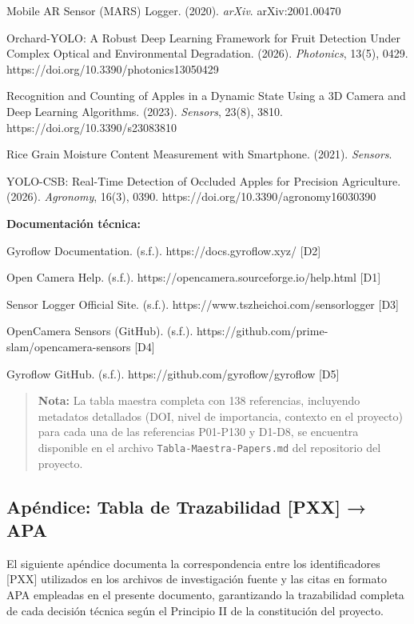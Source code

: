 Mobile AR Sensor (MARS) Logger. (2020). \textit{arXiv}. arXiv:2001.00470


Orchard-YOLO: A Robust Deep Learning Framework for Fruit Detection Under Complex Optical and Environmental Degradation. (2026). \textit{Photonics}, 13(5), 0429. https://doi.org/10.3390/photonics13050429


Recognition and Counting of Apples in a Dynamic State Using a 3D Camera and Deep Learning Algorithms. (2023). \textit{Sensors}, 23(8), 3810. https://doi.org/10.3390/s23083810


Rice Grain Moisture Content Measurement with Smartphone. (2021). \textit{Sensors}.


YOLO-CSB: Real-Time Detection of Occluded Apples for Precision Agriculture. (2026). \textit{Agronomy}, 16(3), 0390. https://doi.org/10.3390/agronomy16030390


\textbf{Documentación técnica:}


Gyroflow Documentation. (s.f.). https://docs.gyroflow.xyz/ [D2]


Open Camera Help. (s.f.). https://opencamera.sourceforge.io/help.html [D1]


Sensor Logger Official Site. (s.f.). https://www.tszheichoi.com/sensorlogger [D3]


OpenCamera Sensors (GitHub). (s.f.). https://github.com/prime-slam/opencamera-sensors [D4]


Gyroflow GitHub. (s.f.). https://github.com/gyroflow/gyroflow [D5]


\begin{quote}
\textbf{Nota:} La tabla maestra completa con 138 referencias, incluyendo metadatos detallados (DOI, nivel de importancia, contexto en el proyecto) para cada una de las referencias P01-P130 y D1-D8, se encuentra disponible en el archivo \texttt{Tabla-Maestra-Papers.md} del repositorio del proyecto.
\end{quote}


\hline


\subsection{Apéndice: Tabla de Trazabilidad [PXX] → APA}


El siguiente apéndice documenta la correspondencia entre los identificadores [PXX] utilizados en los archivos de investigación fuente y las citas en formato APA empleadas en el presente documento, garantizando la trazabilidad completa de cada decisión técnica según el Principio II de la constitución del proyecto.



